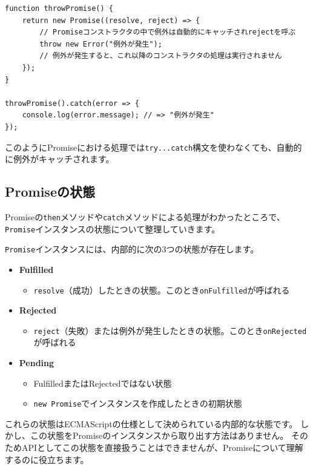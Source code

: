 \begin{lstlisting}
function throwPromise() {
    return new Promise((resolve, reject) => {
        // Promiseコンストラクタの中で例外は自動的にキャッチされrejectを呼ぶ
        throw new Error("例外が発生");
        // 例外が発生すると、これ以降のコンストラクタの処理は実行されません
    });
}

throwPromise().catch(error => {
    console.log(error.message); // => "例外が発生"
});
\end{lstlisting}

このようにPromiseにおける処理では\texttt{try...catch}構文を使わなくても、自動的に例外がキャッチされます。

\hypertarget{promise-status}{%
\subsection{Promiseの状態}\label{promise-status}}

Promiseの\texttt{then}メソッドや\texttt{catch}メソッドによる処理がわかったところで、\texttt{Promise}インスタンスの状態について整理していきます。

\texttt{Promise}インスタンスには、内部的に次の3つの状態が存在します。

\begin{itemize}
\item
  \textbf{Fulfilled}

  \begin{itemize}
  \item
    \texttt{resolve}（成功）したときの状態。このとき\texttt{onFulfilled}が呼ばれる
  \end{itemize}
\item
  \textbf{Rejected}

  \begin{itemize}
  \item
    \texttt{reject}（失敗）または例外が発生したときの状態。このとき\texttt{onRejected}が呼ばれる
  \end{itemize}
\item
  \textbf{Pending}

  \begin{itemize}
  \item
    FulfilledまたはRejectedではない状態
  \item
    \texttt{new Promise}でインスタンスを作成したときの初期状態
  \end{itemize}
\end{itemize}

これらの状態はECMAScriptの仕様として決められている内部的な状態です。
しかし、この状態をPromiseのインスタンスから取り出す方法はありません。
そのためAPIとしてこの状態を直接扱うことはできませんが、Promiseについて理解するのに役立ちます。

